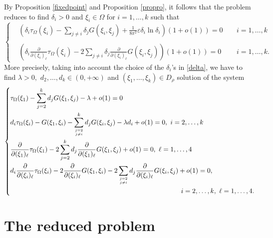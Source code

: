 \documentclass[11pt,a4paper]{amsart}
\newcommand{\e}{\varepsilon}
\renewcommand{\d }{\delta }
\theoremstyle{definition}
\renewcommand{\(}{\left(}
\renewcommand{\)}{\right)}
\begin{document}
By Proposition \ref{fixedpoint} and  Proposition \ref{propro}, it follows that the problem reduces to find $\delta_i>0$ and $\xi_i\in\Omega$ for $i=1, \ldots, k$ such that 
\begin{equation}\label{sys1}\left\{\begin{aligned} &\left(\d_i \tau_\Omega(\xi_i)-\sum_{j\neq i}\d_j G(\xi_i, \xi_j)+\frac{1}{8\pi^2}\e\d_i \ln\d_i\right)\left(1+o(1)\right)=0\, \quad &i=1, \ldots, k\\\\
&\left(\d_i \frac{\partial}{\partial(\xi_i)_\ell} \tau_\Omega(\xi_i)-2\sum_{j\neq i}\d_j \frac{\partial}{\partial(\xi_i)_\ell}G(\xi_i, \xi_j)\right)\left(1+o(1)\right)=0\quad &i=1, \ldots, k.\end{aligned}\right.\end{equation}
More precisely, taking into account the choice of the $\delta_i$'s in \eqref{delta}, we have to find $\lambda>0,$ $d_2,\dots,d_{k}\in (0,+\infty)$ 
and $(\xi_1,\dots,\xi_k)\in D_\rho$ solution of the  system 
\begin{equation}\label{sys2}\left\{\begin{aligned} &\tau_\Omega(\xi_1)-\sum_{j=2}^k d_j G(\xi_1, \xi_j)-\lambda+o(1)=0\,\\
&d_i \tau_\Omega(\xi_i)-G(\xi_1, \xi_i)-\sum_{j=2\atop j\neq i}^k d_j G(\xi_i, \xi_j)-\lambda d_i+o(1)=0,\ i=2, \ldots, k\\
&\frac{\partial}{\partial(\xi_1)_\ell}\tau_\Omega(\xi_1) -2\sum_{j=2}^k d_j\frac{\partial}{\partial(\xi_1)_\ell} G(\xi_1, \xi_j)+o(1)=0,\ \ell=1, \ldots, 4\\
&d_i \frac{\partial}{\partial(\xi_i)_\ell} \tau_\Omega(\xi_i)-2\frac{\partial}{\partial(\xi_i)_\ell}G(\xi_1, \xi_i)-2\sum_{j=2\atop j\neq i}d_j \frac{\partial}{\partial(\xi_i)_\ell} G(\xi_i, \xi_j)+o(1)=0,\\ &\hskip9truecm i=2, \ldots, k,\   \ell=1, \ldots, 4.\end{aligned}\right.\end{equation}

\section{The reduced problem}\label{sec2}
\end{document}
